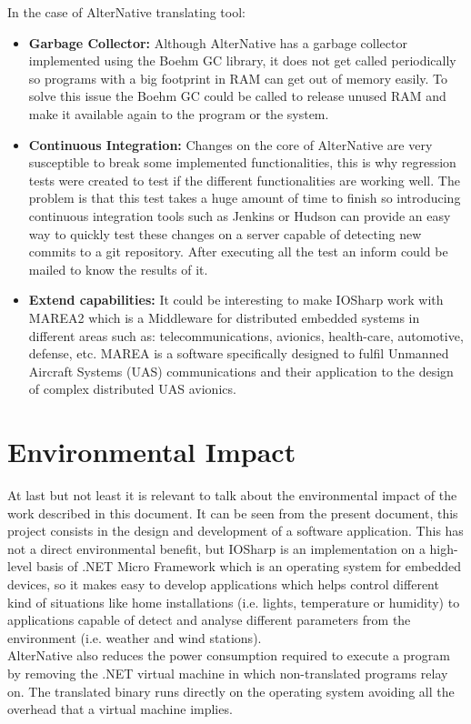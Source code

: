 In the case of AlterNative translating tool:
\begin{itemize}
\item \textbf{Garbage Collector:} Although AlterNative has a garbage collector implemented using the Boehm GC library, it does not get called periodically so programs with a big footprint in RAM can get out of memory easily. To solve this issue the Boehm GC could be called to release unused RAM and make it available again to the program or the system.

\item \textbf{Continuous Integration:} Changes on the core of AlterNative are very susceptible to break some implemented functionalities, this is why regression tests were created to test if the different functionalities are working well. The problem is that this test takes a huge amount of time to finish so introducing continuous integration tools such as Jenkins or Hudson can provide an easy way to quickly test these changes on a server capable of detecting new commits to a git repository. After executing all the test an inform could be mailed to know the results of it.

\item \textbf{Extend capabilities:} It could be interesting to make IOSharp work with MAREA2 which is a Middleware for distributed embedded systems in different areas such as: telecommunications, avionics, health-care, automotive, defense, etc. MAREA is a software specifically designed to fulfil Unmanned Aircraft Systems (UAS) communications and their application to the design of complex distributed UAS avionics.
\end{itemize}

\section{Environmental Impact}\label{S:Environmental-Impact}
At last but not least it is relevant to talk about the environmental impact of the work described in this document. It can be seen from the present document, this project consists in the design and development of a software application. This has not a direct environmental benefit, but IOSharp is an implementation on a high-level basis of .NET Micro Framework which is an operating system for embedded devices, so it makes easy to develop applications which helps control different kind of situations like home installations (i.e. lights, temperature or humidity) to applications capable of detect and analyse different parameters from the environment (i.e. weather and wind stations).
\\
AlterNative also reduces the power consumption required to execute a program by removing the .NET virtual machine in which non-translated programs relay on. The translated binary runs directly on the operating system avoiding all the overhead that a virtual machine implies.